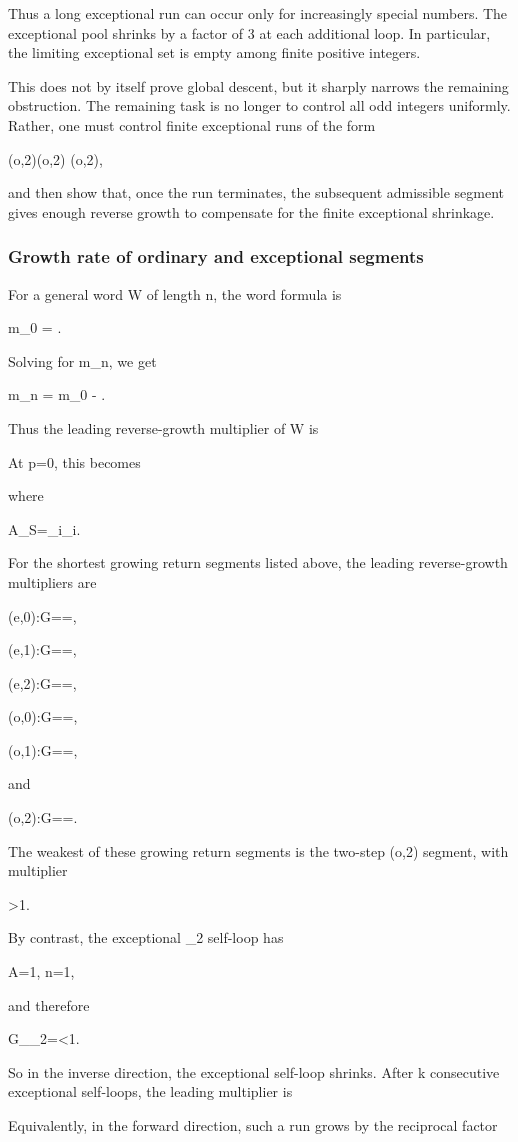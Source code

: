 \documentclass[11pt,letterpaper]{amsart}
\def\({}%
\def\){}%
\def\[{ }%
\def\]{ }%
\theoremstyle{definition}
\theoremstyle{plain}
\theoremstyle{plain}
\theoremstyle{remark}
\begin{document}
Thus a long exceptional run can occur only for increasingly special
numbers.  The exceptional pool shrinks by a factor of \(3\) at each
additional loop.  In particular, the limiting exceptional set is empty
among finite positive integers.

This does not by itself prove global descent, but it sharply narrows the
remaining obstruction.  The remaining task is no longer to control all
odd integers uniformly.  Rather, one must control finite exceptional
runs of the form
\[
(o,2)(o,2)
\cdots
{}(o,2),
\]
and then show that, once the run terminates, the subsequent admissible
segment gives enough reverse growth to compensate for the finite
exceptional shrinkage.

\subsubsection{Growth rate of ordinary and exceptional segments}
\label{subsubsec:growth-rate-exceptional-segments}

For a general word \(W\) of length \(n\), the word formula is
\[
m_0
=
.
\]
Solving for \(m_n\), we get
\[
m_n
=
m_0
-
.
\]
Thus the leading reverse-growth multiplier of \(W\) is
\[
\]
At \(p=0\), this becomes
\[
\]
where
\[
A_S=\sum_i\alpha_i.
\]

For the shortest growing return segments listed above, the leading
reverse-growth multipliers are
\[
(e,0):\quad G==,
\]
\[
(e,1):\quad G==,
\]
\[
(e,2):\quad G==,
\]
\[
(o,0):\quad G==,
\]
\[
(o,1):\quad G==,
\]
and
\[
(o,2):\quad G==.
\]
The weakest of these growing return segments is the two-step
\((o,2)\) segment, with multiplier
\[
>1.
\]

By contrast, the exceptional \(\Omega_2\) self-loop has
\[
A=1,
\qquad
n=1,
\]
and therefore
\[
G_{\Omega_2}=<1.
\]
So in the inverse direction, the exceptional self-loop shrinks.  After
\(k\) consecutive exceptional self-loops, the leading multiplier is
\[
\]
Equivalently, in the forward direction, such a run grows by the
reciprocal factor
\[
\]
\end{document}

